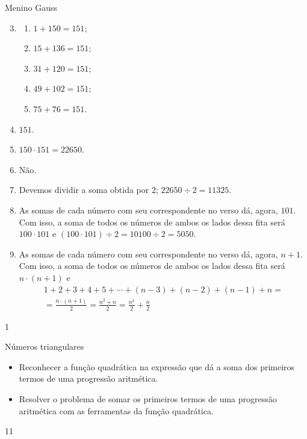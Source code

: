 \begin{answer}{Menino Gauss}
{
\begin{enumerate}\setcounter{enumi}{2}
\item {} 
\begin{enumerate}[label=\Roman*)]
\item \(1+150=151\);

\item \(15+136=151\);

\item \(31+120=151\);

\item \(49+102=151\);

\item \(75+76=151\).
\end{enumerate}

\item {} 
\(151\).

\item {} 
\(150 \cdot 151=22650\).

\item {} 
Não.

\item {} 
Devemos dividir a soma obtida por \(2\); \(22650 \div 2=11325\).

\item {} 
As somas de cada número com seu correspondente no verso dá, agora, \(101\). Com isso, a soma de todos os números de ambos os lados dessa fita será \(100 \cdot 101\) e \((100 \cdot 101) \div 2 = 10100 \div 2 = 5050\).

\item {} 
As somas de cada número com seu correspondente no verso dá, agora, \(n+1\). Com isso, a soma de todos os números de ambos os lados dessa fita será \(n \cdot (n+1)\) e
\begin{gather*}
1+2+3+4+5+ \cdots +(n-3)+(n-2)+(n-1)+n=\\=\frac{n \cdot (n+1)}{2}
=\frac{n^2 + n}{2}=\frac{n^2}{2} + \frac{n}{2}
\end{gather*}
\end{enumerate}
}{1}
\end{answer}
\clearmargin
\begin{objectives}{Números triangulares}
{
\begin{itemize}
\item Reconhecer a função quadrática na expressão que dá a soma dos primeiros termos de uma progressão aritmética.
\item Resolver o problema de somar os primeiros termos de uma progressão aritmética com as ferramentas da função quadrática.
\end{itemize}
}{1}{1}
\end{objectives}

